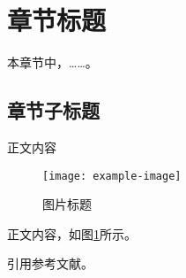 
\newpage
\section{章节标题} %


本章节中，……。


\subsection{章节子标题} %
    正文内容

    \begin{figure}[h]
        \centering
        \texttt{[image: example-image]} 
        \caption{图片标题\protect} %
        \label{img} 
    \end{figure}

    正文内容，如图\ref{img}所示。

    引用参考文献。
